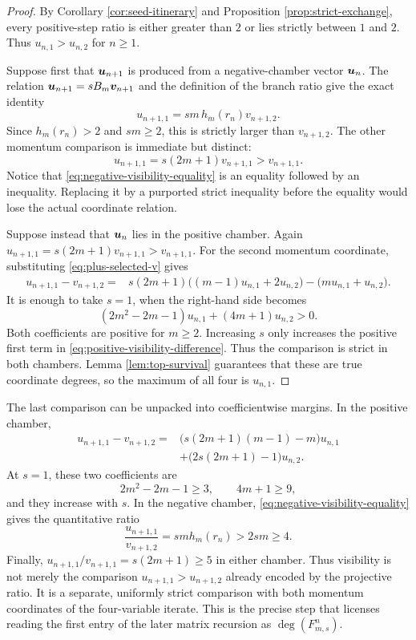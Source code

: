 \documentclass[11pt]{article}
\theoremstyle{definition}
\theoremstyle{remark}
\begin{document}
\begin{proof}
By Corollary \ref{cor:seed-itinerary} and Proposition
\ref{prop:strict-exchange}, every positive-step ratio is either greater than
\(2\) or lies strictly between \(1\) and \(2\).  Thus
\(u_{n,1}>u_{n,2}\) for \(n\geq1\).

Suppose first that \(\boldsymbol{u}_{n+1}\) is produced from a negative-chamber vector
\(\boldsymbol{u}_n\).  The relation \(\boldsymbol{u}_{n+1}=sB_m\boldsymbol{v}_{n+1}\) and the definition of
the branch ratio give the exact identity
\begin{equation}
u_{n+1,1}=sm\,h_m(r_n)v_{n+1,2}.
\label{eq:negative-visibility-equality}
\end{equation}
Since \(h_m(r_n)>2\) and \(sm\geq2\), this is strictly larger than
\(v_{n+1,2}\).  The other momentum comparison is immediate but distinct:
\[
u_{n+1,1}=s(2m+1)v_{n+1,1}>v_{n+1,1}.
\]
Notice that \eqref{eq:negative-visibility-equality} is an equality followed
by an inequality.  Replacing it by a purported strict inequality before the
equality would lose the actual coordinate relation.

Suppose instead that \(\boldsymbol{u}_n\) lies in the positive chamber.  Again
\(u_{n+1,1}=s(2m+1)v_{n+1,1}>v_{n+1,1}\).  For the second momentum
coordinate, substituting \eqref{eq:plus-selected-v} gives
\begin{align}
u_{n+1,1}-v_{n+1,2}
={}&s(2m+1)\bigl((m-1)u_{n,1}+2u_{n,2}\bigr)
  -\bigl(mu_{n,1}+u_{n,2}\bigr).
\label{eq:positive-visibility-difference}
\end{align}
It is enough to take \(s=1\), when the right-hand side becomes
\[
(2m^2-2m-1)u_{n,1}+(4m+1)u_{n,2}>0.
\]
Both coefficients are positive for \(m\geq2\).  Increasing \(s\) only
increases the positive first term in
\eqref{eq:positive-visibility-difference}.  Thus the comparison is strict in
both chambers.  Lemma \ref{lem:top-survival} guarantees that these are true
coordinate degrees, so the maximum of all four is \(u_{n,1}\).
\end{proof}

The last comparison can be unpacked into coefficientwise margins.  In the
positive chamber,
\begin{align*}
u_{n+1,1}-v_{n+1,2}
={}&\bigl(s(2m+1)(m-1)-m\bigr)u_{n,1}\\
&+\bigl(2s(2m+1)-1\bigr)u_{n,2}.
\end{align*}
At \(s=1\), these two coefficients are
\[
2m^2-2m-1\geq3,
\qquad
4m+1\geq9,
\]
and they increase with \(s\).  In the negative chamber,
\eqref{eq:negative-visibility-equality} gives the quantitative ratio
\[
\frac{u_{n+1,1}}{v_{n+1,2}}
=smh_m(r_n)>2sm\geq4.
\]
Finally,
\(u_{n+1,1}/v_{n+1,1}=s(2m+1)\geq5\) in either chamber.
Thus visibility is not merely the comparison
\(u_{n+1,1}>u_{n+1,2}\) already encoded by the projective ratio.  It is a
separate, uniformly strict comparison with both momentum coordinates of the
four-variable iterate.  This is the precise step that licenses reading the
first entry of the later matrix recursion as \(\deg(F_{m,s}^n)\).
\end{document}
